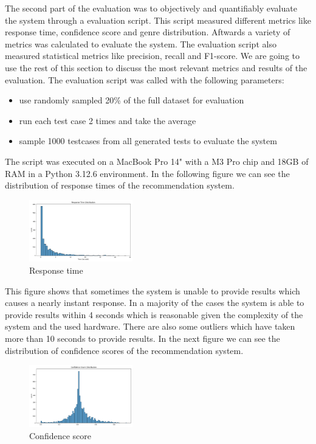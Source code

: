 \documentclass[12pt,a4paper]{article}
\begin{document}

\noindent The second part of the evaluation was to objectively and quantifiably evaluate the system through a evaluation script.
This script measured different metrics like response time, confidence score and genre distribution.
Aftwards a variety of metrics was calculated to evaluate the system.
The evaluation script also measured statistical metrics like precision, recall and F1-score.
We are going to use the rest of this section to discuss the most relevant metrics and results of the evaluation.
The evaluation script was called with the following parameters:
\begin{itemize}
  \item use randomly sampled 20\% of the full dataset for evaluation
  \item run each test case 2 times and take the average
  \item sample 1000 testcases from all generated tests to evaluate the system
\end{itemize}

\noindent The script was executed on a MacBook Pro 14" with a M3 Pro chip and 18GB of RAM in a Python 3.12.6 environment.
In the following figure we can see the distribution of response times of the recommendation system.

\begin{figure}[H]
  \centering
  \includegraphics[width=0.4\textwidth]{../assets/response_time_dist.png}
  \caption{Response time}
\end{figure}

\noindent This figure shows that sometimes the system is unable to provide results which causes a nearly instant response.
In a majority of the cases the system is able to provide results within 4 seconds which is reasonable given the complexity of the system and the used hardware.
There are also some outliers which have taken more than 10 seconds to provide results.
In the next figure we can see the distribution of confidence scores of the recommendation system.

\begin{figure}[H]
  \centering
  \includegraphics[width=0.4\textwidth]{../assets/confidence_dist.png}
  \caption{Confidence score}
\end{figure}
\end{document}
